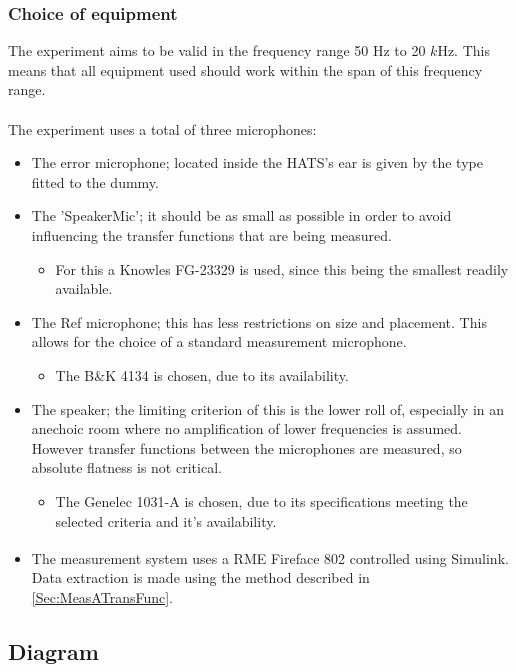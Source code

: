 \subsubsection{Choice of equipment}
The experiment aims to be valid in the frequency range 50 Hz to 20 $k$Hz. This means that all equipment used should work within the span of this frequency range. \\\\
The experiment uses a total of three microphones:
\begin{itemize}
	\item The error microphone; located inside the HATS's ear is given by the type fitted to the dummy.
	\item The 'SpeakerMic'; it should be as small as possible in order to avoid influencing the transfer functions that are being measured.
	\begin{itemize}
		\item For this a Knowles FG-23329 is used, since this being the smallest readily available.
	\end{itemize}
	\item The Ref microphone; this has less restrictions on size and placement. This allows for the choice of a standard measurement microphone.
	\begin{itemize}
		\item The B\&K 4134 is chosen, due to its availability.
	\end{itemize}
	\item The speaker; the limiting criterion of this is the lower roll of, especially in an anechoic room where no amplification of lower frequencies is assumed. However transfer functions between the microphones are measured, so absolute flatness is not critical.
	\begin{itemize}
		\item The Genelec 1031-A is chosen, due to its specifications meeting the selected criteria and it's availability.
	\end{itemize}
	\item The measurement system uses a RME Fireface 802 controlled using Simulink\textsuperscript{\textregistered}. Data extraction is made using the method described in \autoref{Sec:MeasATransFunc}.
\end{itemize}

\subsection{Diagram}

